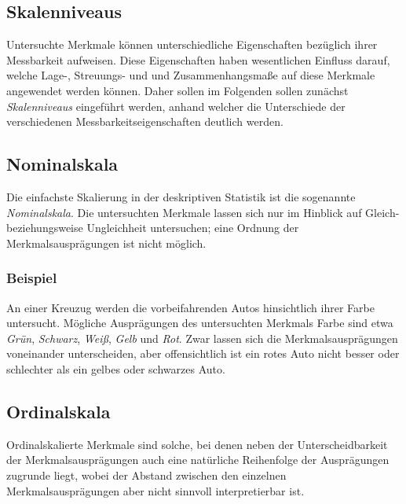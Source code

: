 \documentclass[fontsize=11pt]{scrartcl}
\begin{document}
            \subsection{Skalenniveaus}
                Untersuchte Merkmale können unterschiedliche Eigenschaften bezüglich ihrer Messbarkeit aufweisen. Diese Eigenschaften haben wesentlichen Einfluss darauf, welche Lage-, Streuungs- und und Zusammenhangsmaße auf diese Merkmale angewendet werden können.
                Daher sollen im Folgenden sollen zunächst \emph{Skalenniveaus} eingeführt werden, anhand welcher die Unterschiede der verschiedenen Messbarkeitseigenschaften deutlich werden.
            \subsection{Nominalskala}
                Die einfachste Skalierung in der deskriptiven Statistik ist die sogenannte \emph{Nominalskala}. Die untersuchten Merkmale lassen sich nur im Hinblick auf Gleich- beziehungsweise Ungleichheit untersuchen; eine Ordnung der Merkmalsausprägungen ist nicht möglich. 
                \cite{kohn2005}
                \subsubsection{Beispiel}
                    An einer Kreuzug werden die vorbeifahrenden Autos hinsichtlich ihrer Farbe untersucht. Mögliche Ausprägungen des untersuchten Merkmals Farbe sind etwa \emph{Grün}, \emph{Schwarz}, \emph{Weiß}, \emph{Gelb} und \emph{Rot}. Zwar lassen sich die Merkmalsausprägungen voneinander unterscheiden, aber offensichtlich ist ein rotes Auto nicht besser oder schlechter als ein gelbes oder schwarzes Auto.
                \subsection{Ordinalskala}
                    Ordinalskalierte Merkmale sind solche, bei denen neben der Unterscheidbarkeit der Merkmalsausprägungen auch eine natürliche Reihenfolge der Ausprägungen zugrunde liegt, wobei der Abstand zwischen den einzelnen Merkmalsausprägungen aber nicht sinnvoll interpretierbar ist. \cite{kohn2005}
\end{document}
